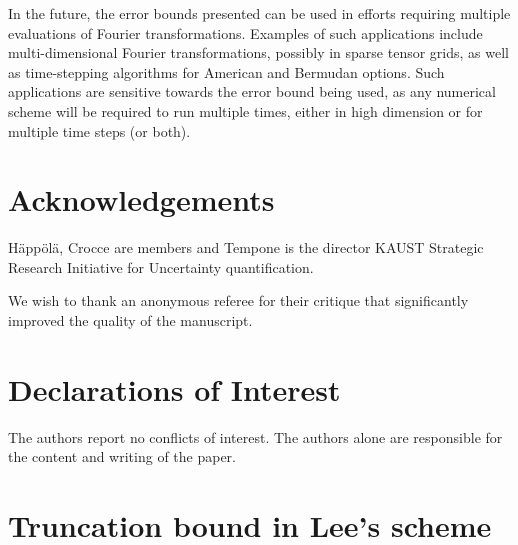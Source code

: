 \documentclass[11pt]{amsart}
\begin{document}
In the future, the error bounds presented can be used in efforts requiring
multiple evaluations of Fourier transformations. Examples of such applications
include multi-dimensional Fourier transformations, possibly in sparse tensor grids,
as well as time-stepping algorithms for American and Bermudan options.
Such applications are sensitive towards the error bound
being used, as any numerical scheme will be required to run multiple times, either
in high dimension or for multiple time steps (or both).


\section{Acknowledgements}

H\"app\"ol\"a, Crocce are members and Tempone is the director KAUST Strategic Research Initiative
for Uncertainty quantification.

We wish to thank an anonymous referee for their critique that significantly improved the quality of the manuscript.

\section{Declarations of Interest}

The authors report no conflicts of interest. The authors alone are responsible for the content and writing of the paper.




\appendix

\section{Truncation bound in Lee's scheme}
\end{document}
